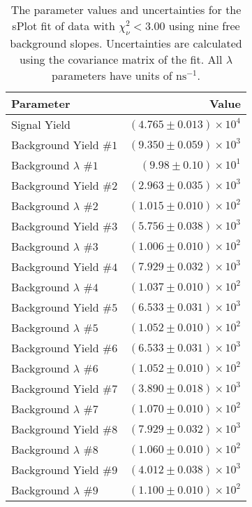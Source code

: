 
\begin{table}[ht]
    \begin{center}
        \begin{tabular}{lr}\toprule
            Parameter & Value \\\midrule
            Signal Yield & $(4.765 \pm 0.013) \times 10^{4}$ \\
            Background Yield $\#1$ & $(9.350 \pm 0.059) \times 10^{3}$ \\
            Background $\lambda$ $\#1$ & $(9.98 \pm 0.10) \times 10^{1}$ \\
            Background Yield $\#2$ & $(2.963 \pm 0.035) \times 10^{3}$ \\
            Background $\lambda$ $\#2$ & $(1.015 \pm 0.010) \times 10^{2}$ \\
            Background Yield $\#3$ & $(5.756 \pm 0.038) \times 10^{3}$ \\
            Background $\lambda$ $\#3$ & $(1.006 \pm 0.010) \times 10^{2}$ \\
            Background Yield $\#4$ & $(7.929 \pm 0.032) \times 10^{3}$ \\
            Background $\lambda$ $\#4$ & $(1.037 \pm 0.010) \times 10^{2}$ \\
            Background Yield $\#5$ & $(6.533 \pm 0.031) \times 10^{3}$ \\
            Background $\lambda$ $\#5$ & $(1.052 \pm 0.010) \times 10^{2}$ \\
            Background Yield $\#6$ & $(6.533 \pm 0.031) \times 10^{3}$ \\
            Background $\lambda$ $\#6$ & $(1.052 \pm 0.010) \times 10^{2}$ \\
            Background Yield $\#7$ & $(3.890 \pm 0.018) \times 10^{3}$ \\
            Background $\lambda$ $\#7$ & $(1.070 \pm 0.010) \times 10^{2}$ \\
            Background Yield $\#8$ & $(7.929 \pm 0.032) \times 10^{3}$ \\
            Background $\lambda$ $\#8$ & $(1.060 \pm 0.010) \times 10^{2}$ \\
            Background Yield $\#9$ & $(4.012 \pm 0.038) \times 10^{3}$ \\
            Background $\lambda$ $\#9$ & $(1.100 \pm 0.010) \times 10^{2}$ \\\bottomrule
        \end{tabular}
        \caption{The parameter values and uncertainties for the sPlot fit of data with $\chi^2_\nu < 3.00$ using nine free background slopes. Uncertainties are calculated using the covariance matrix of the fit. All $\lambda$ parameters have units of $\si{\nano\second}^{-1}$.}\label{tab:splot-fit-results-chisqdof-3.00-free-9}
    \end{center}
\end{table}
